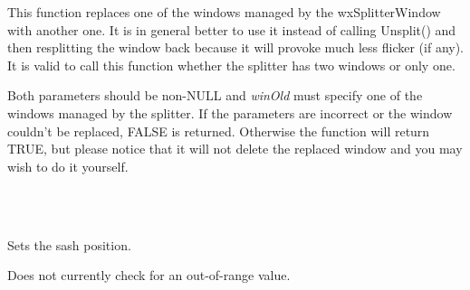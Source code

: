 \label{wxsplitterwindowreplacewindow}


This function replaces one of the windows managed by the wxSplitterWindow with
another one. It is in general better to use it instead of calling Unsplit()
and then resplitting the window back because it will provoke much less flicker
(if any). It is valid to call this function whether the splitter has two
windows or only one.

Both parameters should be non-NULL and {\it winOld} must specify one of the
windows managed by the splitter. If the parameters are incorrect or the window
couldn't be replaced, FALSE is returned. Otherwise the function will return
TRUE, but please notice that it will not delete the replaced window and you
may wish to do it yourself.




\\
\\

\label{wxsplitterwindowsetsashposition}


Sets the sash position.





Does not currently check for an out-of-range value.



\label{wxsplitterwindowsetminimumpanesize}

